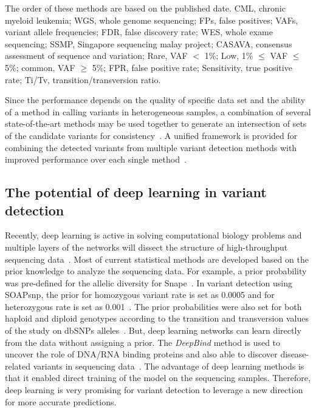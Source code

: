 \documentclass[a4,center,fleqn]{NAR}
\begin{document}
\begin{landscape}
\begin{table}[htbp]
\begin{threeparttable}
\begin{tabular}{rlrr}
    \bottomrule
    \end{tabular}
   \begin{tablenotes}
	\item The order of these methods are based on the published date.
CML, chronic myeloid leukemia;
WGS, whole genome sequencing;
FPs, false positives;
VAFs, variant allele frequencies;
FDR, false discovery rate;
WES, whole exame sequencing;
SSMP, Singapore sequencing malay project;
CASAVA, consensus assessment of sequence and variation;
Rare, VAF $<$ 1\%; Low, 1\% $\leqslant$ VAF $\leqslant$  5\%; common, VAF $\geqslant$ 5\%;
FPR, false positive rate;
Sensitivity, true positive rate;
Ti/Tv, transition/transversion ratio.
    \end{tablenotes}
\end{threeparttable}
\end{table}
\end{landscape}


Since the performance depends on the quality of specific data set and the ability of a method in calling variants in heterogeneous samples, a combination of several state-of-the-art methods may be used together to generate an intersection of sets of the candidate variants for consistency~\citep{liu2013variant}.
A unified framework is provided for combining the detected variants from multiple variant detection methods with improved performance over each single method~\citep{kim2014combining}.


\subsection{The potential of deep learning in variant detection}

Recently, deep learning is active in solving computational biology problems and multiple layers of the networks will dissect the structure of high-throughput sequencing data~\citep{angermueller2016deep}.
Most of current statistical methods are developed based on the prior knowledge to analyze the sequencing data.
For example, a prior probability was pre-defined for the allelic diversity for Snape~\citep{Raineri2012}.
In variant detection using SOAPsnp, the prior for homozygous variant rate is set as 0.0005 and for heterozygous rate is set as 0.001~\citep{Li2009}.
The prior probabilities were also set for both haploid and diploid genotypes according to the transition and transversion values of the study on dbSNPs alleles~\citep{zhao2002neighboring}. 
But, deep learning networks can learn directly from the data without assigning a prior.
The \textit{DeepBind} method is used to uncover the role of DNA/RNA binding proteins and also able to discover disease-related variants in sequencing data~\citep{alipanahi2015predicting}.
The advantage of deep learning methods is that it enabled direct training of the model on the sequencing samples.
Therefore, deep learning is very promising for variant detection to leverage a new direction for more accurate predictions.
\end{document}
